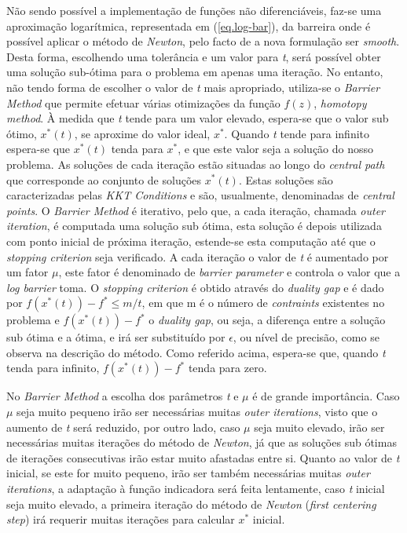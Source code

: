 \documentclass[a4paper]{IEEEtran}
\begin{document}
Não sendo possível a implementação de funções não diferenciáveis, faz-se uma aproximação logarítmica, representada em (\ref{eq.log-bar}), da barreira onde é possível aplicar o método de \textit{Newton}, pelo facto de a nova formulação ser \textit{smooth}. Desta forma, escolhendo uma tolerância e um valor para \textit{t}, será possível obter uma solução sub-ótima para o problema em apenas uma iteração. No entanto, não tendo forma de escolher o valor de \textit{t} mais apropriado, utiliza-se o \textit{Barrier Method} que permite efetuar várias otimizações da função $f(z)$, \textit{homotopy method}.
À medida que \textit{t} tende para um valor elevado, espera-se que o valor sub ótimo, $x^\ast(t)$, se aproxime do valor ideal, $x^\ast$. Quando \textit{t} tende para infinito espera-se que $x^\ast(t)$ tenda para $x^\ast$, e que este valor seja a solução do nosso problema. As soluções de cada iteração estão situadas ao longo do \textit{central path} que corresponde ao conjunto de soluções $x^\ast(t)$. Estas soluções são caracterizadas pelas \textit{KKT Conditions} e são, usualmente, denominadas de \textit{central points}. O \textit{Barrier Method} é iterativo, pelo que, a cada iteração, chamada \textit{outer iteration}, é computada uma solução sub ótima, esta solução é depois utilizada com ponto inicial de próxima iteração, estende-se esta computação até que o \textit{stopping criterion} seja verificado. A cada iteração o valor de \textit{t} é aumentado por um fator $\mu$, este fator é denominado de \textit{barrier parameter} e controla o valor que a \textit{log barrier} toma. O \textit{stopping criterion} é obtido através do \textit{duality gap} e é dado por $f(x^\ast(t))-f^\ast \leq m/t$, em que m é o número de \textit{contraints} existentes no problema e $f(x^\ast(t))-f^\ast$ o \textit{duality gap}, ou seja, a diferença entre a solução sub ótima e a ótima, e irá ser substituído por $\epsilon$, ou nível de precisão, como se observa na descrição do método. Como referido acima, espera-se que, quando \textit{t} tenda para infinito, $f(x^\ast(t))-f^\ast$ tenda para zero.

No \textit{Barrier Method} a escolha dos parâmetros \textit{t} e $\mu$ é de grande importância. Caso $\mu$ seja muito pequeno irão ser necessárias muitas \textit{outer iterations}, visto que o aumento de \textit{t} será reduzido, por outro lado, caso $\mu$ seja muito elevado, irão ser necessárias muitas iterações do método de \textit{Newton}, já que as soluções sub ótimas de iterações consecutivas irão estar muito afastadas entre si. Quanto ao valor de \textit{t} inicial, se este for muito pequeno, irão ser também necessárias muitas \textit{outer iterations}, a adaptação à função indicadora será feita lentamente, caso \textit{t} inicial seja muito elevado, a primeira iteração do método de \textit{Newton} (\textit{first centering step}) irá requerir muitas iterações para calcular $x^\ast$ inicial.
\end{document}
